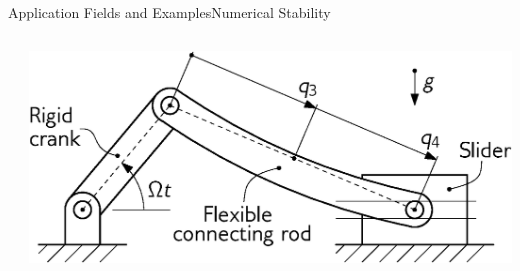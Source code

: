 \begin{frame}{Application Fields and Examples}{Numerical Stability}
  \vspace{-2.0em}\begin{columns}
    \centering
    \begin{column}[c]{0.625\textwidth}
    \end{column}
    \begin{column}[c]{0.3\textwidth}
      \vspace{1.5em}\includegraphics[width=\textwidth]{figures/flexible_slider_crank.eps}
    \end{column}
  \end{columns}
  \vspace{-1.5em}
  
  
\end{frame}

